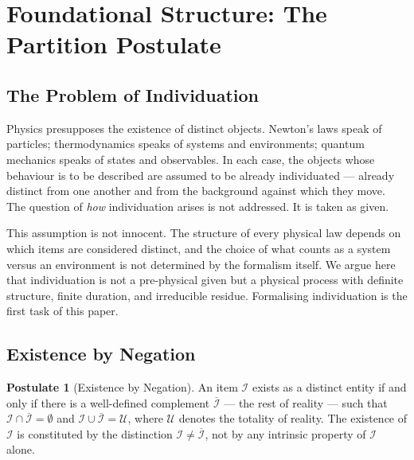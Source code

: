 \documentclass[11pt,twocolumn,a4paper]{article}
\theoremstyle{plain}
\theoremstyle{definition}
\newtheorem{postulate}[theorem]{Postulate}
\theoremstyle{remark}
\begin{document}

\section{Foundational Structure: The Partition Postulate}
\label{sec:axioms}

\subsection{The Problem of Individuation}
\label{subsec:individuation}

Physics presupposes the existence of distinct objects. Newton's laws speak of
particles; thermodynamics speaks of systems and environments; quantum mechanics
speaks of states and observables. In each case, the objects whose behaviour is
to be described are assumed to be already individuated --- already distinct from
one another and from the background against which they move. The question of
\emph{how} individuation arises is not addressed. It is taken as given.

This assumption is not innocent. The structure of every physical law depends on
which items are considered distinct, and the choice of what counts as a system
versus an environment is not determined by the formalism itself. We argue here
that individuation is not a pre-physical given but a physical process with
definite structure, finite duration, and irreducible residue. Formalising
individuation is the first task of this paper.

\subsection{Existence by Negation}
\label{subsec:negation}

\begin{postulate}[Existence by Negation]
\label{post:negation}
An item $\mathcal{I}$ exists as a distinct entity if and only if there is a
well-defined complement $\overline{\mathcal{I}}$ --- the rest of reality --- such
that $\mathcal{I} \cap \overline{\mathcal{I}} = \emptyset$ and
$\mathcal{I} \cup \overline{\mathcal{I}} = \mathcal{U}$, where $\mathcal{U}$
denotes the totality of reality. The existence of $\mathcal{I}$ is constituted
by the distinction $\mathcal{I} \neq \overline{\mathcal{I}}$, not by any
intrinsic property of $\mathcal{I}$ alone.
\end{postulate}
\end{document}
